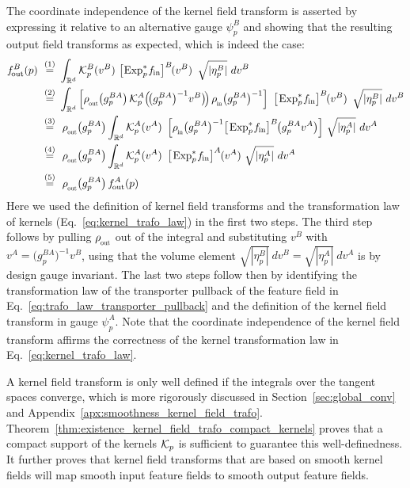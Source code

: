 The coordinate independence of the kernel field transform is asserted by expressing it relative to an alternative gauge $\psi_p^B$ and showing that the resulting output field transforms as expected, which is indeed the case:
\begin{align}\label{eq:kft_coordinate_independence}
    \fout^B(p)\ 
    \overset{(1)}{=}&\ 
        \int_{\R^d}
        \Kp^B(v^B) \ 
        \big[\mkern-2mu \Expspfin\big]^B \mkern-2mu(v^B) \,\ 
        \sqrt{|\eta_p^B|}\ dv^B
    \notag \\ 
    \overset{(2)}{=}&\ 
        \int_{\R^d}
        \Big[ \rhoout\big(g_p^{BA}\big)\, \Kp^A\pig(\! \big(g_p^{BA}\big)^{-1} v^B \big)\!\pig)\, \rhoin\big(g_p^{BA}\big)^{-1} \Big] \,\ 
        \big[\mkern-1mu \Expspfin\big]^B \mkern-2mu(v^B) \,\ 
        \sqrt{|\eta_p^B|}\ dv^B
    \notag \\ 
    \overset{(3)}{=}&\ \ 
        \rhoout\big(g_p^{BA}\big)
        \int_{\R^d}
        \Kp^A(v^A) \,\ 
        \Big[ \rhoin\big(g_p^{BA}\big)^{-1} \big[\mkern-1mu \Expspfin\big]^B \mkern-2mu \big( g_p^{BA} v^A\big) \Big] \ 
        \sqrt{|\eta_p^A|}\ dv^A
    \notag \\ 
    \overset{(4)}{=}&\ \ 
        \rhoout\big(g_p^{BA}\big)
        \int_{\R^d}
        \Kp^A(v^A) \,\ 
        \big[\mkern-1mu \Expspfin\big]^A \mkern-1mu (v^A) \ 
        \sqrt{|\eta_p^A|}\ dv^A
    \notag \\ 
    \overset{(5)}{=}&\ \ 
    \rhoout\big(g_p^{BA}\big) \, \fout^A(p)
\end{align}
Here we used the definition of kernel field transforms and the transformation law of kernels (Eq.~\eqref{eq:kernel_trafo_law}) in the first two steps.
The third step follows by pulling $\rhoout$ out of the integral and substituting $v^B$ with $v^A = \big(g_p^{BA}\big)^{-1} v^B$, using that the volume element $\sqrt{|\eta_p^B|}\ dv^B = \sqrt{|\eta_p^A|}\ dv^A$ is by design gauge invariant.
The last two steps follow then by identifying the transformation law of the transporter pullback of the feature field in Eq.~\eqref{eq:trafo_law_transporter_pullback} and the definition of the kernel field transform in gauge $\psi_p^A$.
Note that the coordinate independence of the kernel field transform affirms the correctness of the kernel transformation law in Eq.~\eqref{eq:kernel_trafo_law}.

A kernel field transform is only well defined if the integrals over the tangent spaces converge, which is more rigorously discussed in Section~\ref{sec:global_conv} and Appendix~\ref{apx:smoothness_kernel_field_trafo}.
Theorem~\ref{thm:existence_kernel_field_trafo_compact_kernels} proves that a compact support of the kernels $\mathcal{K}_p$ is sufficient to guarantee this well-definedness.
It further proves that kernel field transforms that are based on smooth kernel fields will map smooth input feature fields to smooth output feature fields.












